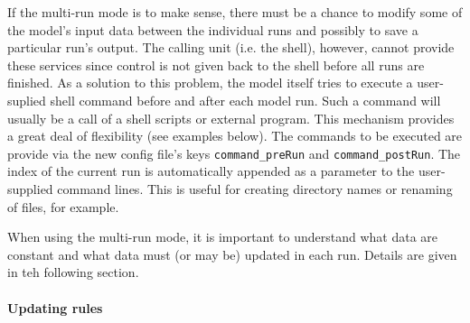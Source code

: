 \documentclass[a4paper,10pt]{article}
\begin{document}
If the multi-run mode is to make sense, there must be a chance to modify some of the model's input data between the individual runs and possibly to save a particular run's output. The calling unit (i.e. the shell), however, cannot provide these services since control is not given back to the shell before all runs are finished. As a solution to this problem, the model itself tries to execute a user-suplied shell command before and after each model run. Such a command will usually be a call of a shell scripts or external program. This mechanism provides a great deal of flexibility (see examples below). The commands to be executed are provide via the new config file's keys \verb!command_preRun! and \verb!command_postRun!. The index of the current run is automatically appended as a parameter to the user-supplied command lines. This is useful for creating directory names or renaming of files, for example.

When using the multi-run mode, it is important to understand what data are constant and what data must (or may be) updated in each run. Details are given in teh following section.

\paragraph{Updating rules}
\end{document}

